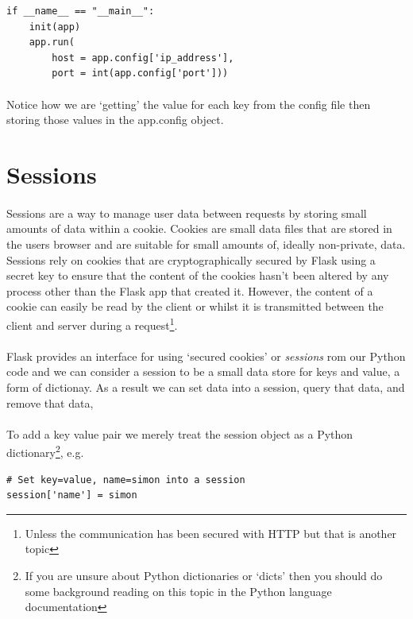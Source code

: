 \documentclass[12pt, a4paper, oneside]{book}
\begin{document}
{\begin{lstlisting}
if __name__ == "__main__":
    init(app)
    app.run(
        host = app.config['ip_address'],
        port = int(app.config['port']))
\end{lstlisting}

\paragraph{}  Notice how we are `getting' the value for each key from the config file then storing those values in the app.config object. 

\section{Sessions}
\label{sessions}
\paragraph{} Sessions are a way to manage user data between requests by storing small amounts of data within a cookie. Cookies are small data files that are stored in the users browser and are suitable for small amounts of, ideally non-private, data. Sessions rely on cookies that are cryptographically secured by Flask using a secret key to ensure that the content of the cookies hasn't been altered by any process other than the Flask app that created it. However, the content of a cookie can easily be read by the client or whilst it is transmitted between the client and server during a request\footnote{Unless the communication has been secured with HTTP but that is another topic}.

\paragraph{} Flask provides an interface for using `secured cookies' or \emph{sessions} rom our Python code and we can consider a session to be a small data store for keys and value, a form of dictionay. As a result we can set data into a session, query that data, and remove that data, 

\paragraph{} To add a key value pair we merely treat the session object as a Python dictionary\footnote{If you are unsure about Python dictionaries or `dicts' then you should do some background reading on this topic in the Python language documentation}, e.g.
\begin{lstlisting}
# Set key=value, name=simon into a session
session['name'] = simon
\end{lstlisting}

}
\end{document}
